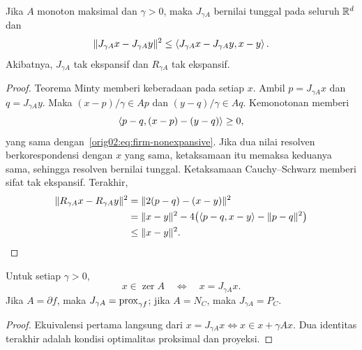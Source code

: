 \begin{theorem}
  \label{orig02:theorem:resolvent-firm}
  Jika $A$ monoton maksimal dan $\gamma>0$, maka $J_{\gamma A}$ bernilai
  tunggal pada seluruh $\mathbb{R}^d$ dan
  \begin{equation}
    \label{orig02:eq:firm-nonexpansive}
    \|J_{\gamma A}x-J_{\gamma A}y\|^2
    \leq
    \left\langle J_{\gamma A}x-J_{\gamma A}y , x-y\right\rangle.
  \end{equation}
  Akibatnya, $J_{\gamma A}$ tak ekspansif dan $R_{\gamma A}$ tak ekspansif.
\end{theorem}
\begin{proof}
  Teorema Minty memberi keberadaan pada setiap $x$. Ambil
  $p=J_{\gamma A}x$ dan $q=J_{\gamma A}y$. Maka
  $(x-p)/\gamma\in Ap$ dan $(y-q)/\gamma\in Aq$. Kemonotonan memberi
  \begin{equation}
    \left\langle p-q , (x-p)-(y-q)\right\rangle\geq0,
  \end{equation}
  yang sama dengan~\eqref{orig02:eq:firm-nonexpansive}. Jika dua nilai
  resolven berkorespondensi dengan $x$ yang sama, ketaksamaan itu memaksa
  keduanya sama, sehingga resolven bernilai tunggal. Ketaksamaan
  Cauchy--Schwarz memberi sifat tak ekspansif. Terakhir,
  \begin{equation}
  \begin{aligned}
    \|R_{\gamma A}x-R_{\gamma A}y\|^2
    & =\|2(p-q)-(x-y)\|^2\\
    & =\|x-y\|^2
      -4\bigl(\left\langle p-q , x-y\right\rangle-\|p-q\|^2\bigr)\\
    & \leq\|x-y\|^2.
  \end{aligned}
  \end{equation}
\end{proof}

\begin{cor}
  \label{orig02:cor:zero-fixed}
  Untuk setiap $\gamma>0$,
  \begin{equation}
    \label{orig02:eq:zero-fixed}
    x\in\operatorname{zer}A
    \quad\Longleftrightarrow\quad
    x=J_{\gamma A}x.
  \end{equation}
  Jika $A=\partial f$, maka $J_{\gamma A}=\mathrm{prox}_{\gamma f}$; jika
  $A=N_C$, maka $J_{\gamma A}=P_C$.
\end{cor}
\begin{proof}
  Ekuivalensi pertama langsung dari
  $x=J_{\gamma A}x\Longleftrightarrow x\in x+\gamma Ax$. Dua identitas
  terakhir adalah kondisi optimalitas proksimal dan proyeksi.
\end{proof}

